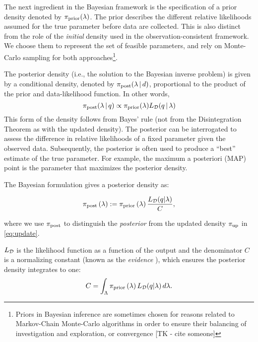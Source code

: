 The next ingredient in the Bayesian framework is the specification of a prior density denoted by $\pi_\text{prior}(\lambda)$.
The prior describes the different relative likelihoods assumed for the true parameter before data are collected.
This is also distinct from the role of the {\em initial} density used in the observation-consistent framework.
We choose them to represent the set of feasible parameters, and rely on Monte-Carlo sampling for both approaches\footnote{Priors in Bayesian inference are sometimes chosen for reasons related to Markov-Chain Monte-Carlo algorithms in order to ensure their balancing of investigation and exploration, or convergence [TK - cite someone]}.

The posterior density (i.e., the solution to the Bayesian inverse problem) is given by a conditional density, denoted by $\pi_\text{post}(\lambda\, | \, d)$, proportional to the product of the prior and data-likelihood function.
In other words,
\begin{equation*}
	\operatorname*{\pi_{post}}(\lambda\, | \, q) \propto \operatorname*{\pi_{prior}}(\lambda)L_{\mathcal{D}}(q\, | \, \lambda)
\end{equation*}
This form of the density follows from Bayes' rule (not from the Disintegration Theorem as with the updated density).
The posterior can be interrogated to assess the difference in relative likelihoods of a fixed parameter given the observed data.
Subsequently, the posterior is often used to produce a ``best'' estimate of the true parameter.
For example, the maximum a posteriori (MAP) point is the parameter that maximizes the posterior density.

The Bayesian formulation \citep{Walpole, Berger, Complete, Smith} gives a posterior density as:

\begin{equation}\label{eq:sb_post}
    \operatorname*{\pi_{post}}\left ( \lambda \right ) := \operatorname*{\pi_{prior}}\left ( \lambda \right ) \frac{L_{\mathcal{D}} (q | \lambda)}{ C },
\end{equation}

where we use $\operatorname*{\pi_{post}}$ to distinguish the \emph{posterior} from the updated density $\operatorname*{\pi_{up}}$ in \eqref{eq:update}.


$L_{\mathcal{D}}$ is the likelihood function as a function of the output and the denominator $C$ is a normalizing constant (known as the \emph{evidence} \cite{Smith}), which ensures the posterior density integrates to one:
\[
C = \int_{\Lambda} \operatorname*{\pi_{prior}}\left ( \lambda \right ) L_{\mathcal{D}}(q | \lambda) \, d\lambda.
\]

